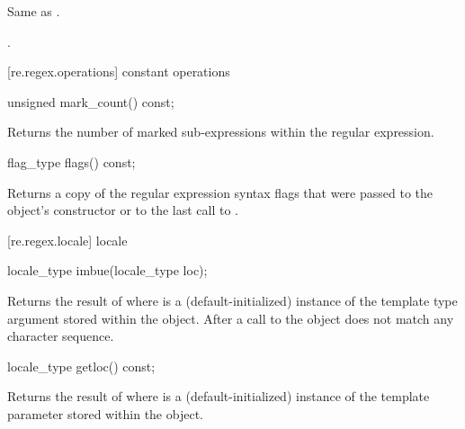 \begin{itemdescr}
\pnum
\effects Same as .

\pnum
\returns {}.
\end{itemdescr}


[re.regex.operations]{ constant operations}

%
\begin{itemdecl}
unsigned mark_count() const;
\end{itemdecl}

\begin{itemdescr}
\pnum
\effects  Returns the number of marked sub-expressions within the
regular expression.
\end{itemdescr}

%
\begin{itemdecl}
flag_type flags() const;
\end{itemdecl}

\begin{itemdescr}
\pnum
\effects  Returns a copy of the regular expression syntax flags that
were passed to the object's constructor or to the last call
to .
\end{itemdescr}

[re.regex.locale]{ locale}%

%
\begin{itemdecl}
locale_type imbue(locale_type loc);
\end{itemdecl}

\begin{itemdescr}
\pnum\effects  Returns the result of  where
 is a (default-initialized) instance of the template
type argument  stored within the object.  After a call
to  the  object does not match any
character sequence.
\end{itemdescr}

%
\begin{itemdecl}
locale_type getloc() const;
\end{itemdecl}

\begin{itemdescr}
\pnum\effects  Returns the result of  where
 is a (default-initialized) instance of the template
parameter  stored within the object.
\end{itemdescr}

